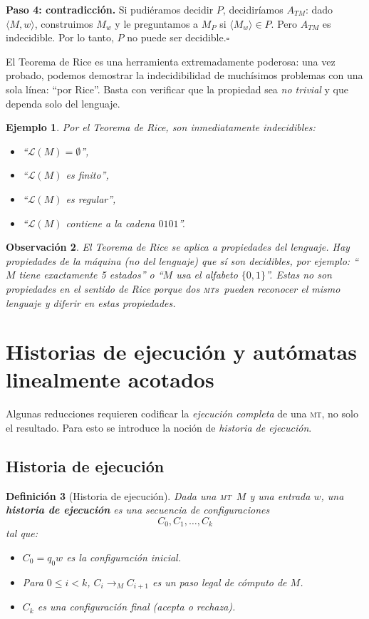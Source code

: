 \documentclass[11pt,a4paper]{article}
\theoremstyle{definicion}
\newtheorem{definicion}{Definición}[section]
\newtheorem{ejemplo}[definicion]{Ejemplo}
\newtheorem{observacion}[definicion]{Observación}
\newcommand{\MT}{\textsc{mt}}
\newcommand{\MTs}{\textsc{mt}s}
\newcommand{\enc}[1]{\langle #1 \rangle}
\newcommand{\Lang}{\mathcal{L}}
\begin{document}
\textbf{Paso 4: contradicción.} Si pudiéramos decidir $P$, decidiríamos $A_{TM}$: dado $\enc{M, w}$, construimos $M_w$ y le preguntamos a $M_P$ si $\enc{M_w} \in P$. Pero $A_{TM}$ es indecidible. Por lo tanto, $P$ no puede ser decidible.\hfill$\square$

\begin{idea}
El Teorema de Rice es una herramienta extremadamente poderosa: una vez probado, podemos demostrar la indecidibilidad de muchísimos problemas con una sola línea: ``por Rice''. Basta con verificar que la propiedad sea \emph{no trivial} y que dependa solo del lenguaje.
\end{idea}

\begin{ejemplo}
Por el Teorema de Rice, son inmediatamente indecidibles:
\begin{itemize}
    \item ``$\Lang(M) = \emptyset$'',
    \item ``$\Lang(M)$ es finito'',
    \item ``$\Lang(M)$ es regular'',
    \item ``$\Lang(M)$ contiene a la cadena $0101$''.
\end{itemize}
\end{ejemplo}

\begin{observacion}
El Teorema de Rice se aplica a propiedades del \emph{lenguaje}. Hay propiedades de la \emph{máquina} (no del lenguaje) que sí son decidibles, por ejemplo: ``$M$ tiene exactamente 5 estados'' o ``$M$ usa el alfabeto $\{0, 1\}$''. Estas no son propiedades en el sentido de Rice porque dos \MTs\ pueden reconocer el mismo lenguaje y diferir en estas propiedades.
\end{observacion}

\section{Historias de ejecución y autómatas linealmente acotados}

Algunas reducciones requieren codificar la \emph{ejecución completa} de una \MT, no solo el resultado. Para esto se introduce la noción de \emph{historia de ejecución}.

\subsection{Historia de ejecución}

\begin{definicion}[Historia de ejecución]
Dada una \MT\ $M$ y una entrada $w$, una \textbf{historia de ejecución} es una secuencia de configuraciones
\[
C_0, C_1, \dots, C_k
\]
tal que:
\begin{itemize}
    \item $C_0 = q_0 w$ es la configuración inicial.
    \item Para $0 \leq i < k$, $C_i \to_M C_{i+1}$ es un paso legal de cómputo de $M$.
    \item $C_k$ es una configuración final (acepta o rechaza).
\end{itemize}
\end{definicion}
\end{document}
